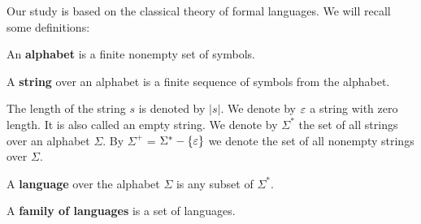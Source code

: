 Our study is based on the classical theory of formal languages. We will recall some definitions:

\begin{definition}
An  {\bf alphabet} is a finite nonempty set of symbols.
\end{definition}

\begin{definition}
A  {\bf string} over an alphabet is a finite sequence of symbols from the alphabet.
\end{definition}

The length of the string $s$ is denoted by $|s|$. We denote by $\varepsilon$ a string with zero length. It is also called an empty string. We denote by $\Sigma^*$ the set of all strings over an alphabet $\Sigma$. By $\Sigma^+$ = $\Sigma^* - \{\varepsilon\}$ we denote the set of all nonempty strings over $\Sigma$.

\begin{definition}
A  {\bf language} over the alphabet $\Sigma$ is any subset of $\Sigma^*$.
\end{definition}

\begin{definition}
A  {\bf family of languages} is a set of languages.
\end{definition}
